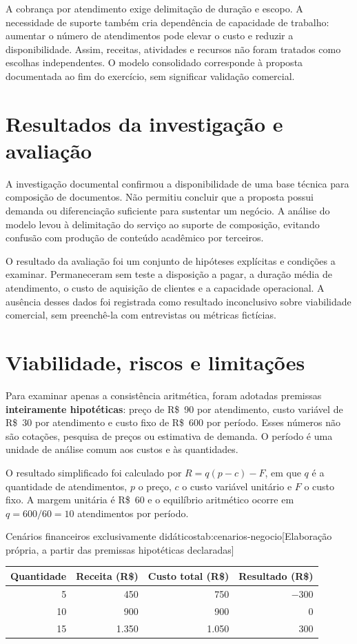 A cobrança por atendimento exige delimitação de duração e escopo. A necessidade
de suporte também cria dependência de capacidade de trabalho: aumentar
o número de atendimentos pode elevar o custo e reduzir a disponibilidade.
Assim, receitas, atividades e recursos não foram tratados como escolhas
independentes. O modelo consolidado corresponde à proposta documentada ao
fim do exercício, sem significar validação comercial.

\chapter{Resultados da investigação e avaliação}
A investigação documental confirmou a disponibilidade de uma base técnica
para composição de documentos. Não permitiu concluir que a proposta possui
demanda ou diferenciação suficiente para sustentar um negócio. A análise do
modelo levou à delimitação do serviço ao suporte de composição, evitando
confusão com produção de conteúdo acadêmico por terceiros.

O resultado da avaliação foi um conjunto de hipóteses explícitas e condições
a examinar. Permaneceram sem teste a disposição a pagar, a duração média
de atendimento, o custo de aquisição de clientes e a capacidade operacional.
A ausência desses dados foi registrada como resultado inconclusivo sobre
viabilidade comercial, sem preenchê-la com entrevistas ou métricas fictícias.

\chapter{Viabilidade, riscos e limitações}
Para examinar apenas a consistência aritmética, foram adotadas premissas
\textbf{inteiramente hipotéticas}: preço de R\$~90 por atendimento, custo
variável de R\$~30 por atendimento e custo fixo de R\$~600 por período.
Esses números não são cotações, pesquisa de preços ou estimativa de demanda.
O período é uma unidade de análise comum aos custos e às quantidades.

O resultado simplificado foi calculado por $R=q(p-c)-F$, em que $q$ é a
quantidade de atendimentos, $p$ o preço, $c$ o custo variável unitário e $F$
o custo fixo. A margem unitária é R\$~60 e o equilíbrio aritmético ocorre
em $q=600/60=10$ atendimentos por período.

\begin{undftabela}[H]{Cenários financeiros exclusivamente didáticos}{tab:cenarios-negocio}[Elaboração própria, a partir das premissas hipotéticas declaradas]
\begin{tabular}{@{}rrrr@{}}
\hline
\textbf{Quantidade} & \textbf{Receita (R\$)} & \textbf{Custo total (R\$)} & \textbf{Resultado (R\$)} \\
\hline
5 & 450 & 750 & $-300$ \\
10 & 900 & 900 & 0 \\
15 & 1.350 & 1.050 & 300 \\
\hline
\end{tabular}
\end{undftabela}

